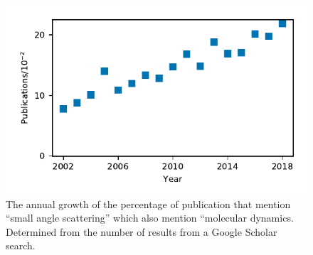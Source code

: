 \documentclass[pdf]{iucr}              %
\begin{document}
%
\begin{figure}
\caption{The annual growth of the percentage of publication that mention ``small angle scattering'' which also mention ``molecular dynamics. Determined from the number of results from a Google Scholar search.}
\label{fig:growth}
\includegraphics[width=\textwidth]{figures/chem_data_py.pdf}
\end{figure}
%
\end{document}
